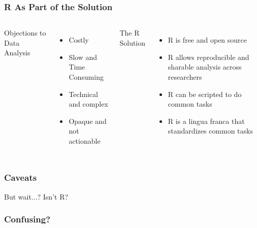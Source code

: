 \documentclass{beamer}
\begin{document}
\begin{frame}
\frametitle{R As Part of the Solution}
  \begin{columns}
  Objections to Data Analysis
  \begin{itemize}
  \item Costly
  \item Slow and Time Consuming
  \item Technical and complex
  \item Opaque and not actionable
  \end{itemize}
  The R Solution
  \begin{itemize}
  \item R is free and open source
  \item R allows reproducible and sharable analysis across researchers
  \item R can be scripted to do common tasks
  \item R is a lingua franca that standardizes common tasks
  \end{itemize}
  \end{columns}
\end{frame}


\begin{frame}
\frametitle{Caveats}
\begin{center}
\Large But wait...? Isn't R?
\end{center}
\end{frame}

% 

{
\begin{frame}[plain]
\frametitle{Confusing?}
\end{frame}
}
\end{document}
